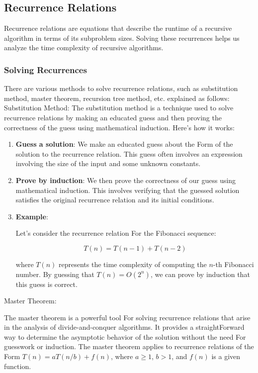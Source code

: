 \documentclass[12pt]{book} %
\begin{document}
\subsection{Recurrence Relations}

Recurrence relations are equations that describe the runtime of a recursive algorithm in terms of its subproblem sizes. Solving these recurrences helps us analyze the time complexity of recursive algorithms.

\subsubsection{Solving Recurrences}

There are various methods to solve recurrence relations, such as substitution method, master theorem, recursion tree method, etc. explained as follows:
\FloatBarrier
Substitution Method:
\FloatBarrier
The substitution method is a technique used to solve recurrence relations by making an educated guess and then proving the correctness of the guess using mathematical induction. Here's how it works:

\begin{enumerate}
    \item \textbf{Guess a solution}: We make an educated guess about the Form of the solution to the recurrence relation. This guess often involves an expression involving the size of the input and some unknown constants.
    
    \item \textbf{Prove by induction}: We then prove the correctness of our guess using mathematical induction. This involves verifying that the guessed solution satisfies the original recurrence relation and its initial conditions.
    
    \item \textbf{Example}:
    
    Let's consider the recurrence relation For the Fibonacci sequence:
    
    \[
    T(n) = T(n-1) + T(n-2)
    \]
    
    where \(T(n)\) represents the time complexity of computing the \(n\)-th Fibonacci number. By guessing that \(T(n) = O(2^n)\), we can prove by induction that this guess is correct.
\end{enumerate}
\FloatBarrier
Master Theorem:
\FloatBarrier

The master theorem is a powerful tool For solving recurrence relations that arise in the analysis of divide-and-conquer algorithms. It provides a straightForward way to determine the asymptotic behavior of the solution without the need For guesswork or induction. The master theorem applies to recurrence relations of the Form \(T(n) = aT(n/b) + f(n)\), where \(a \geq 1\), \(b > 1\), and \(f(n)\) is a given function.
\end{document}
